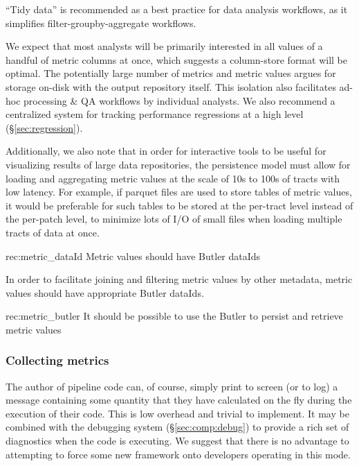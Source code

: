 ``Tidy data'' \citep{JSSv059i10} is recommended as a best practice for data analysis workflows, as it simplifies filter-groupby-aggregate workflows.

We expect that most analysts will be primarily interested in all values of a handful of metric columns at once, which suggests a column-store format will be optimal.
The potentially large number of metrics and metric values argues for storage on-disk with the output repository itself.
This isolation also facilitates ad-hoc processing \& QA workflows by individual analysts.
We also recommend a centralized system for tracking performance regressions at a high level (\S \ref{sec:regression}).

Additionally, we also note that in order for interactive tools to be useful for visualizing results of large data repositories, the persistence model must allow for loading and aggregating metric values at the scale of 10s to 100s of tracts with low latency.
For example, if parquet files are used to store tables of metric values, it would be preferable for such tables to be stored at the per-tract level instead of the per-patch level, to minimize lots of I/O of small files when loading multiple tracts of data at once.


\begin{recommendation}
    {rec:metric_dataId}
    {Metric values should have Butler dataIds}
\end{recommendation}

In order to facilitate joining and filtering metric values by other metadata, metric values should have appropriate Butler dataIds.

\begin{recommendation}
    {rec:metric_butler}
    {It should be possible to use the Butler to persist and retrieve metric values}
\end{recommendation}


\subsubsection{Collecting metrics}
\label{sec:comp:metric:collect}

The author of pipeline code can, of course, simply print to screen (or to log) a message containing some quantity that they have calculated on the fly during the execution of their code.
This is low overhead and trivial to implement.
It may be combined with the debugging system (\S\ref{sec:comp:debug}) to provide a rich set of diagnostics when the code is executing.
We suggest that there is no advantage to attempting to force some new framework onto developers operating in this mode.

